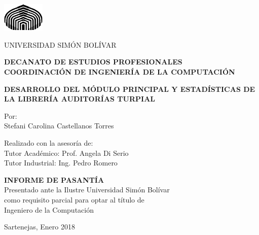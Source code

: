 \thispagestyle{empty}

\begin{center}
    \begin{singlespace}
        \includegraphics[width=2cm]{logo_USB}
        
        {\large
          UNIVERSIDAD SIMÓN BOLÍVAR\\
        }
        
        \textbf{
          DECANATO DE ESTUDIOS PROFESIONALES\\
          COORDINACIÓN DE INGENIERÍA DE LA COMPUTACIÓN
        }
        
        \vspace{4cm}%
        \textbf{
          DESARROLLO DEL MÓDULO PRINCIPAL Y ESTADÍSTICAS DE LA LIBRERÍA AUDITORÍAS TURPIAL
        }
        \vspace{4cm}
        
        Por:\\
        Stefani Carolina Castellanos Torres
        
        \vspace{1cm}
        Realizado con la asesoría de:\\
        Tutor Académico: Prof. Angela Di Serio\\
        Tutor Industrial: Ing. Pedro Romero
        
        \vspace{2cm}
          \textbf{INFORME DE PASANTÍA}\\
          Presentado ante la Ilustre Universidad Simón Bolívar\\
          como requisito parcial para optar al título de\\
          Ingeniero de la Computación\\
        \selectfont
        
        \vspace{3cm}
    Sartenejas, Enero 2018
    
    \end{singlespace}
\end{center}



